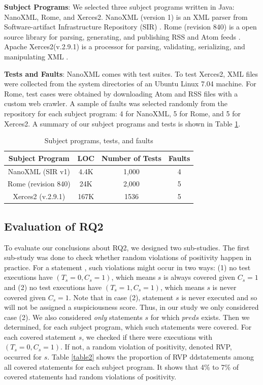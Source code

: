 {\bf Subject Programs}: We selected three subject programs written in Java: NanoXML, Rome, and Xerces2.  NanoXML \cite{Nanoxml} (version 1) is an XML parser from Software-artifact Infrastructure Repository (SIR) \cite{SIR}.  Rome (revision 840) is a open source library for parsing, generating, and publishing RSS and Atom feeds \cite{Rome}.  Apache Xerces2(v.2.9.1) is a processor for parsing, validating, serializing, and manipulating XML \cite{Xerces2}.  

{\bf Tests and Faults}: NanoXML comes with test suites.  To test Xerces2, XML files were collected from the system directories of an Ubuntu Linux 7.04 machine.  For Rome, test cases were obtained by downloading Atom and RSS files with a custom web crawler.  A sample of faults was selected randomly from the repository for each subject program: 4 for NanoXML, 5 for Rome, and 5 for Xerces2.  A summary of our subject programs and tests is shown in Table \ref{table1}.  

\begin{table}
\caption{Subject programs, tests, and faults}\label{table1}
\centering
\begin{tabular}{|c|c|c|c|}
\hline
Subject Program	&	LOC	&	Number of Tests	&	Faults	\\ \hline
NanoXML (SIR v1)	&	4.4K	&	1,000	&	4	\\ \hline
Rome (revision 840)	&	24K	&	2,000	&	5	\\ \hline
Xerces2 (v.2.9.1)	&	167K	&	1536	&	5	\\ \hline

\end{tabular}
\end{table}


\subsection{Evaluation of RQ2}\label{sec4.2}

To evaluate our conclusions about RQ2, we designed two sub-studies. The first sub-study was done to check whether random violations of positivity happen in practice. For a statement , such violations might occur in two ways: (1) no test executions have $(T_s=0,C_s=1)$, which means $s$ is always covered given $C_s=1$ and (2) no test executions have $(T_s=1,C_s=1)$, which means $s$ is never covered given $C_s=1$.  Note that in case (2), statement $s$ is never executed and so will not be assigned a suspiciousness score.  Thus, in our study we only considered case (2).  We also considered {\it only} statements $s$ for which $pred{s}$ exists.  Then we determined, for each subject program, which such statements were covered.  For each covered statement $s$, we checked if there were executions with $(T_s=0,C_s=1)$.  If not, a random violation of positivity, denoted RVP, occurred for $s$.  Table \ref{table2} shows the proportion of RVP ddstatements among all covered statements for each subject program.  It shows that 4\% to 7\% of covered statements had random violations of positivity.

